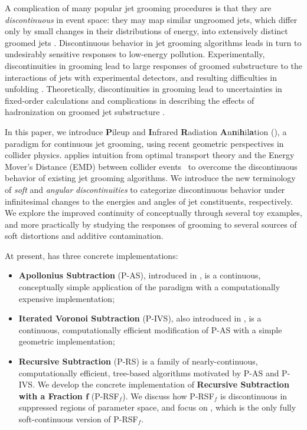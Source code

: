 \documentclass[letterpaper,11pt]{article}
\begin{document}
A complication of many popular jet grooming procedures is that they are \textit{discontinuous} in event space:
%
they may map similar ungroomed jets, which differ only by small changes in their distributions of energy, into extensively distinct groomed jets \cite{Dasgupta:2013ihk,Larkoski:2014wba}.
%
Discontinuous behavior in jet grooming algorithms leads in turn to undesirably sensitive responses to low-energy pollution.
%
Experimentally, discontinuities in grooming lead to large responses of groomed substructure to the interactions of jets with experimental detectors, and resulting difficulties in unfolding \cite{ATL-PHYS-PUB-2019-027,Aad:2019vyi,ATLAS:2020gwe}.
%
Theoretically, discontinuities in grooming lead to uncertainties in fixed-order calculations \cite{Larkoski:2014wba} and complications in describing the effects of hadronization on groomed jet substructure \cite{Hoang:2019ceu}.

In this paper, we introduce \textbf{P}ileup and \textbf{I}nfrared \textbf{R}adiation \textbf{A}n\textbf{n}i\textbf{h}il\textbf{a}tion (\PIRANHA{}), a paradigm for continuous jet grooming, using recent geometric perspectives in collider physics.
%
\PIRANHA{} applies intuition from optimal transport theory and the Energy Mover's Distance (EMD) between collider events~\cite{Komiske:2019fks,Komiske:2020qhg} to overcome the discontinuous behavior of existing jet grooming algorithms.
%
We introduce the new terminology of \textit{soft} and \textit{angular} \textit{discontinuities} to categorize discontinuous behavior under infinitesimal changes to the energies and angles of jet constituents, respectively.
%
We explore the improved continuity of \PIRANHA{} conceptually through several toy examples, and more practically by studying the responses of \PIRANHA{} grooming to several sources of soft distortions and additive contamination.

At present, \PIRANHA{} has three concrete implementations:
\begin{itemize}
    \item
    \textbf{Apollonius Subtraction} (P-AS), introduced in , is a continuous, conceptually simple application of the \PIRANHA{} paradigm with a computationally expensive implementation;

    \item
    \textbf{Iterated Voronoi Subtraction} (P-IVS), also introduced in , is a continuous, computationally efficient modification of P-AS with a simple geometric implementation;

    \item
    \textbf{Recursive Subtraction} (P-RS) is a family of nearly-continuous, computationally efficient, tree-based algorithms motivated by P-AS and P-IVS.
    We develop the concrete implementation of \textbf{Recursive Subtraction with a Fraction \(\boldsymbol{f}\)} (P-RSF\(_f\)).
    We discuss how P-RSF\(_f\) is discontinuous in suppressed regions of parameter space, and focus on , which is the only fully soft-continuous version of P-RSF\(_f\).
\end{itemize}
\end{document}
